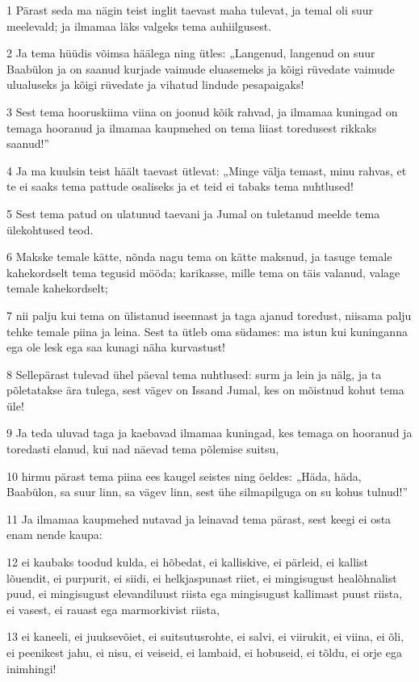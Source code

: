 \par 1 Pärast seda ma nägin teist inglit taevast maha tulevat, ja temal oli suur meelevald; ja ilmamaa läks valgeks tema auhiilgusest.
\par 2 Ja tema hüüdis võimsa häälega ning ütles: „Langenud, langenud on suur Baabülon ja on saanud kurjade vaimude eluasemeks ja kõigi rüvedate vaimude ulualuseks ja kõigi rüvedate ja vihatud lindude pesapaigaks!
\par 3 Sest tema hooruskiima viina on joonud kõik rahvad, ja ilmamaa kuningad on temaga hooranud ja ilmamaa kaupmehed on tema liiast toredusest rikkaks saanud!”
\par 4 Ja ma kuulsin teist häält taevast ütlevat: „Minge välja temast, minu rahvas, et te ei saaks tema pattude osaliseks ja et teid ei tabaks tema nuhtlused!
\par 5 Sest tema patud on ulatunud taevani ja Jumal on tuletanud meelde tema ülekohtused teod.
\par 6 Makske temale kätte, nõnda nagu tema on kätte maksnud, ja tasuge temale kahekordselt tema tegusid mööda; karikasse, mille tema on täis valanud, valage temale kahekordselt;
\par 7 nii palju kui tema on ülistanud iseennast ja taga ajanud toredust, niisama palju tehke temale piina ja leina. Sest ta ütleb oma südames: ma istun kui kuninganna ega ole lesk ega saa kunagi näha kurvastust!
\par 8 Sellepärast tulevad ühel päeval tema nuhtlused: surm ja lein ja nälg, ja ta põletatakse ära tulega, sest vägev on Issand Jumal, kes on mõistnud kohut tema üle!
\par 9 Ja teda uluvad taga ja kaebavad ilmamaa kuningad, kes temaga on hooranud ja toredasti elanud, kui nad näevad tema põlemise suitsu,
\par 10 hirmu pärast tema piina ees kaugel seistes ning öeldes: „Häda, häda, Baabülon, sa suur linn, sa vägev linn, sest ühe silmapilguga on su kohus tulnud!”
\par 11 Ja ilmamaa kaupmehed nutavad ja leinavad tema pärast, sest keegi ei osta enam nende kaupa:
\par 12 ei kaubaks toodud kulda, ei hõbedat, ei kalliskive, ei pärleid, ei kallist lõuendit, ei purpurit, ei siidi, ei helkjaspunast riiet, ei mingisugust healõhnalist puud, ei mingisugust elevandiluust riista ega mingisugust kallimast puust riista, ei vasest, ei rauast ega marmorkivist riista,
\par 13 ei kaneeli, ei juuksevõiet, ei suitsutusrohte, ei salvi, ei viirukit, ei viina, ei õli, ei peenikest jahu, ei nisu, ei veiseid, ei lambaid, ei hobuseid, ei tõldu, ei orje ega inimhingi!

